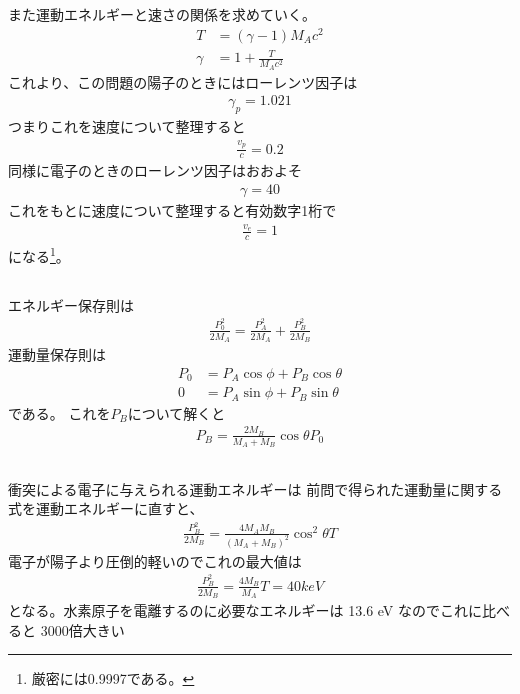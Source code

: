 \documentclass[../../master.tex]{subfiles}
\begin{document}
また運動エネルギーと速さの関係を求めていく。
\begin{align}
    T &= (\gamma-1)M_Ac^2\\
    \gamma &= 1+\frac{T}{M_Ac^2}
\end{align}
これより、この問題の陽子のときにはローレンツ因子は
\begin{align}
    \gamma_p = 1.021
\end{align}
つまりこれを速度について整理すると
\begin{align}
    \frac{v_p}{c} = 0.2
\end{align}
同様に電子のときのローレンツ因子はおおよそ
\begin{align}
    \gamma = 40
\end{align}
これをもとに速度について整理すると有効数字1桁で
\begin{align}
    \frac{v_e}{c} = 1
\end{align}
になる\footnote{厳密には0.9997である。}。

\subsection{}
エネルギー保存則は
\begin{align}
    \frac{P_0^2}{2M_A} = \frac{P_A^2}{2M_A}+\frac{P_B^2}{2M_B}
\end{align}
運動量保存則は
\begin{align}
    P_0 &= P_A\cos\phi+P_B\cos\theta\\
    0 &= P_A\sin\phi+P_B\sin\theta
\end{align}
である。
これを\(P_B\)について解くと
\begin{align}
    P_B = \frac{2M_B}{M_A+M_B}\cos\theta P_0
\end{align}

\subsection{}
衝突による電子に与えられる運動エネルギーは
前問で得られた運動量に関する式を運動エネルギーに直すと、
\begin{align}
    \frac{P_B^2}{2M_B} = \frac{4M_AM_B}{(M_A+M_B)^2}\cos^2\theta T
\end{align}
電子が陽子より圧倒的軽いのでこれの最大値は
\begin{align}
    \frac{P_B^2}{2M_B} = \frac{4M_B}{M_A}T = 40 keV
\end{align}
となる。水素原子を電離するのに必要なエネルギーは 13.6 eV なのでこれに比べると 3000倍大きい
\end{document}
